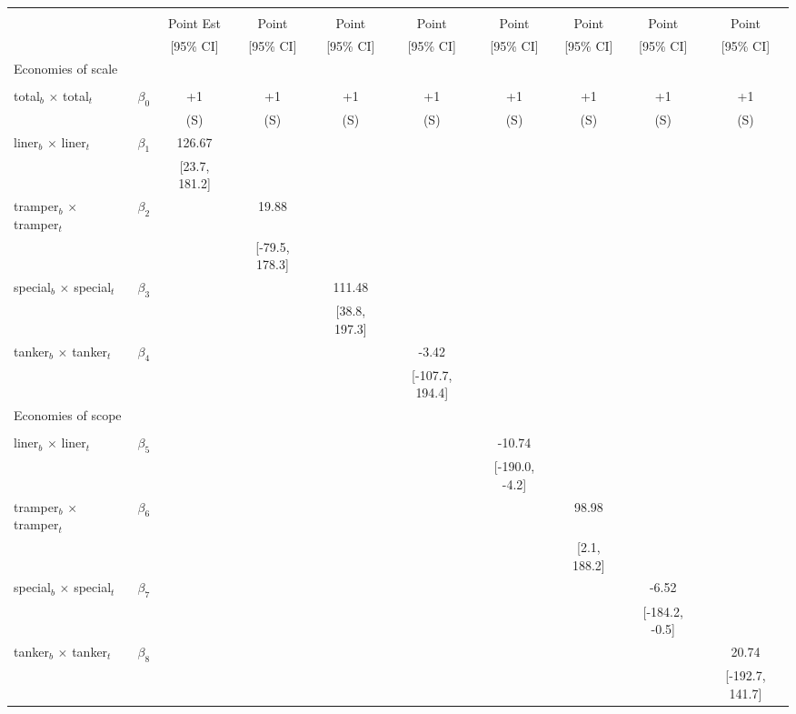 \begin{tabular}{@{\extracolsep{5pt}}lccccccccc}
\toprule 
 &  &  &  &  &  &  &  &  &  \\
 &  & Point Est & Point & Point & Point & Point & Point & Point & Point \\
 &  & [95\% CI] & [95\% CI] & [95\% CI] & [95\% CI] & [95\% CI] & [95\% CI] & [95\% CI] & [95\% CI] \\
\midrule 
Economies of scale &  &  &  &  &  &  &  \\
 &  &  &  &  &  &  &  &  \\
total$_{b}$ $\times$ total$_{t}$ & $\beta_0$ & +1 & +1 & +1 & +1 & +1 & +1 & +1 & +1 \\
 &  & (S) & (S) & (S) & (S) & (S) & (S) & (S) & (S) \\
liner$_{b}$ $\times$ liner$_{t}$ & $\beta_1$ & 126.67 &  &  &  &  &  &  &  \\
 &  & [23.7, 181.2] &  &  &  &  &  &  &  \\
tramper$_{b}$ $\times$ tramper$_{t}$ & $\beta_2$ &  & 19.88 &  &  &  &  &  &  \\
 &  &  & [-79.5, 178.3] &  &  &  &  &  &  \\
special$_{b}$ $\times$ special$_{t}$ & $\beta_3$ &  &  & 111.48 &  &  &  &  &  \\
 &  &  &  & [38.8, 197.3] &  &  &  &  &  \\
tanker$_{b}$ $\times$ tanker$_{t}$ & $\beta_4$ &  &  &  & -3.42 &  &  &  &  \\
 &  &  &  &  & [-107.7, 194.4] &  &  &  &  \\
Economies of scope &  &  &  &  &  &  &  &  &  \\
 &  &  &  &  &  &  &  &  &  \\
liner$_{b}$ $\times$ liner$_{t}$ & $\beta_5$ &  &  &  &  & -10.74 &  &  &  \\
 &  &  &  &  &  & [-190.0, -4.2] &  &  &  \\
tramper$_{b}$ $\times$ tramper$_{t}$ & $\beta_6$ &  &  &  &  &  & 98.98 &  &  \\
 &  &  &  &  &  &  & [2.1, 188.2] &  &  \\
special$_{b}$ $\times$ special$_{t}$ & $\beta_7$ &  &  &  &  &  &  & -6.52 &  \\
 &  &  &  &  &  &  &  & [-184.2, -0.5] &  \\
tanker$_{b}$ $\times$ tanker$_{t}$ & $\beta_8$ &  &  &  &  &  &  &  & 20.74 \\
 &  &  &  &  &  &  &  &  & [-192.7, 141.7] \\

\end{tabular}
